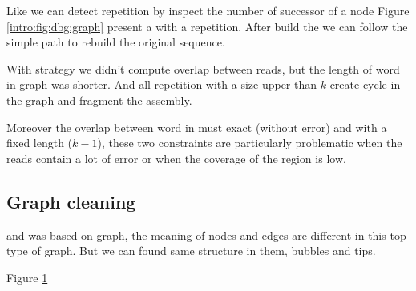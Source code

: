 \documentclass[./main.tex]{subfiles}
\begin{document}
Like \OLC we can detect repetition by inspect the number of successor of a node Figure \ref{intro:fig:dbg:graph} present a \DBG with a repetition. After build the \DBG we can follow the simple path to rebuild the original sequence.

With \DBG strategy we didn't compute overlap between reads, but the length of word in graph was shorter. And all repetition with a size upper than $k$ create cycle in the graph and fragment the assembly.

Moreover the overlap between word in \DBG must exact (without error) and with a fixed length ($k - 1$), these two constraints are particularly problematic when the reads contain a lot of error or when the coverage of the region is low.






\subsection{Graph cleaning}

\OLC and \DBG was based on graph, the meaning of nodes and edges are different in this top type of graph. But we can found same structure in them, bubbles and tips.

Figure \ref{intro:fig:cleaning}

\begin{figure}[ht]
    \caption{}
    \label{intro:fig:cleaning}
\end{figure}
\end{document}
